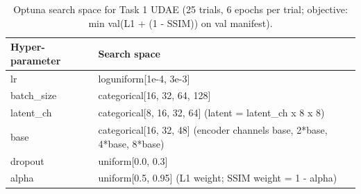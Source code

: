 \begin{table}[t]
\centering
\caption{Optuna search space for Task 1 UDAE (25 trials, 6 epochs per trial; objective: min val(L1 + (1 - SSIM)) on val manifest).}
\label{tab:space_task1_udae}
\footnotesize
\begin{tabular}{lp{5.6cm}}
\toprule
Hyper-parameter & Search space \\
\midrule
lr & loguniform[1e-4, 3e-3] \\
batch\_size & categorical[16, 32, 64, 128] \\
latent\_ch & categorical[8, 16, 32, 64]  (latent = latent\_ch x 8 x 8) \\
base & categorical[16, 32, 48]  (encoder channels base, 2*base, 4*base, 8*base) \\
dropout & uniform[0.0, 0.3] \\
alpha & uniform[0.5, 0.95]  (L1 weight; SSIM weight = 1 - alpha) \\
\bottomrule
\end{tabular}
\end{table}
